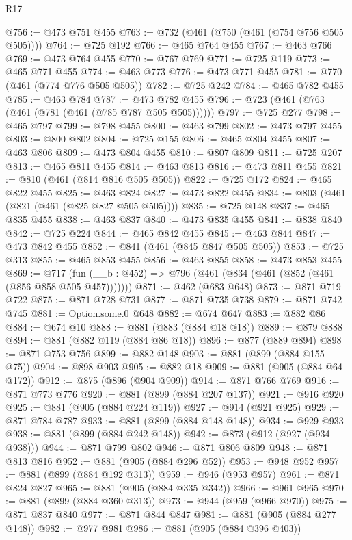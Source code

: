 \begin{lexlean}{R17}
\begin{coremodule}
@756 := @473 @751 @455
@763 := @732 (@461 (@750 (@461 (@754 @756 @505 @505))))
@764 := @725 @192
@766 := @465 @764 @455
@767 := @463 @766
@769 := @473 @764 @455
@770 := @767 @769
@771 := @725 @119
@773 := @465 @771 @455
@774 := @463 @773
@776 := @473 @771 @455
@781 := @770 (@461 (@774 @776 @505 @505))
@782 := @725 @242
@784 := @465 @782 @455
@785 := @463 @784
@787 := @473 @782 @455
@796 := @723 (@461 (@763 (@461 (@781 (@461 (@785 @787 @505 @505))))))
@797 := @725 @277
@798 := @465 @797
@799 := @798 @455
@800 := @463 @799
@802 := @473 @797 @455
@803 := @800 @802
@804 := @725 @155
@806 := @465 @804 @455
@807 := @463 @806
@809 := @473 @804 @455
@810 := @807 @809
@811 := @725 @207
@813 := @465 @811 @455
@814 := @463 @813
@816 := @473 @811 @455
@821 := @810 (@461 (@814 @816 @505 @505))
@822 := @725 @172
@824 := @465 @822 @455
@825 := @463 @824
@827 := @473 @822 @455
@834 := @803 (@461 (@821 (@461 (@825 @827 @505 @505))))
@835 := @725 @148
@837 := @465 @835 @455
@838 := @463 @837
@840 := @473 @835 @455
@841 := @838 @840
@842 := @725 @224
@844 := @465 @842 @455
@845 := @463 @844
@847 := @473 @842 @455
@852 := @841 (@461 (@845 @847 @505 @505))
@853 := @725 @313
@855 := @465 @853 @455
@856 := @463 @855
@858 := @473 @853 @455
@869 := @717 (fun (__b : @452) => @796 (@461 (@834 (@461 (@852 (@461 (@856 @858 @505 @457)))))))
@871 := @462 (@683 @648)
@873 := @871 @719 @722
@875 := @871 @728 @731
@877 := @871 @735 @738
@879 := @871 @742 @745
@881 := Option.some.{0} @648
@882 := @674 @647
@883 := @882 @86
@884 := @674 @10
@888 := @881 (@883 (@884 @18 @18))
@889 := @879 @888
@894 := @881 (@882 @119 (@884 @86 @18))
@896 := @877 (@889 @894)
@898 := @871 @753 @756
@899 := @882 @148
@903 := @881 (@899 (@884 @155 @75))
@904 := @898 @903
@905 := @882 @18
@909 := @881 (@905 (@884 @64 @172))
@912 := @875 (@896 (@904 @909))
@914 := @871 @766 @769
@916 := @871 @773 @776
@920 := @881 (@899 (@884 @207 @137))
@921 := @916 @920
@925 := @881 (@905 (@884 @224 @119))
@927 := @914 (@921 @925)
@929 := @871 @784 @787
@933 := @881 (@899 (@884 @148 @148))
@934 := @929 @933
@938 := @881 (@899 (@884 @242 @148))
@942 := @873 (@912 (@927 (@934 @938)))
@944 := @871 @799 @802
@946 := @871 @806 @809
@948 := @871 @813 @816
@952 := @881 (@905 (@884 @296 @52))
@953 := @948 @952
@957 := @881 (@899 (@884 @192 @313))
@959 := @946 (@953 @957)
@961 := @871 @824 @827
@965 := @881 (@905 (@884 @335 @342))
@966 := @961 @965
@970 := @881 (@899 (@884 @360 @313))
@973 := @944 (@959 (@966 @970))
@975 := @871 @837 @840
@977 := @871 @844 @847
@981 := @881 (@905 (@884 @277 @148))
@982 := @977 @981
@986 := @881 (@905 (@884 @396 @403))

\end{coremodule}
\end{lexlean}
